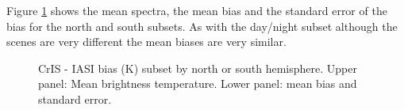 \documentclass[twocolumn,10pt]{article}
\begin{document}
Figure \ref{fig:X6} shows the mean spectra, the mean bias and the standard error of the bias for the north and south subsets.
As with the day/night subset although the scenes are very different the mean biases are
very similar.

\begin{figure}[htb]
  \centering
\hfill
  \caption{CrIS - IASI bias (K) subset by north or south hemisphere. Upper panel: Mean brightness temperature. Lower panel: mean bias and standard error.}%
  \label{fig:X6}
\end{figure}
\end{document}
